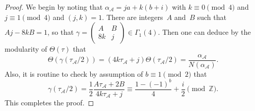\documentclass[11pt, reqno]{amsart}
\theoremstyle{plain}
\theoremstyle{definition}
\numberwithin{equation}{section}
\begin{document}
\begin{proof}
We begin by noting that $\alpha_{\mathcal{A}}=ja+k(b+i)$ with $k\equiv0\pmod{4}$ and $j\equiv1\pmod{4}$ and $(j,k)=1$. There are integers~$A$ and~$B$ such that $Aj-8kB=1$, so that $\gamma=\begin{pmatrix}
    A&B\\8k&j
\end{pmatrix}\in\Gamma_{1}(4)$. Then one can deduce by the modularity of $\Theta(\tau)$ that
$$
\Theta(\gamma(\tau_{\mathcal{A}}/2))=(4k\tau_{\mathcal{A}}+j)\Theta(\tau_{\mathcal{A}}/2)=\frac{\alpha_{\mathcal{A}}}{N(\alpha_{\mathcal{A}})}.
$$
Also, it is routine to check by assumption of $b\equiv1\pmod{2}$ that
$$
\gamma(\tau_{\mathcal{A}}/2)=\frac{1}{2}\frac{A\tau_{\mathcal{A}}+2B}{4k\tau_{\mathcal{A}}+j}\equiv\frac{1-(-1)^{b}}{4}+\frac{i}{2}\pmod{\mathbb{Z}}.
$$
This completes the proof.
\end{proof}
\end{document}
